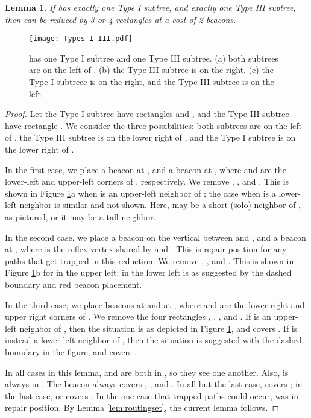 \documentclass{article}
\newtheorem{lemma}{Lemma}
\begin{document}
		\begin{lemma}\label{lem:onethree}
			If  has exactly one Type I subtree, and exactly one Type III subtree,
			then  can be reduced by 3 or 4 rectangles at a cost of 2 beacons.
		\end{lemma}
		\begin{figure}[htbp] 
			\begin{center}
				\texttt{[image: Types-I-III.pdf]} 
			\end{center}
			\caption{  has one Type I subtree and one Type III subtree.
					  (a) both subtrees are on the left of .
					  (b) the Type III subtree is on the right.
					  (c) the Type I subtreee is on the right, and the Type III subtree is on
					  the left.
					}
			\label{fig:typeonethree}
		\end{figure}
		\begin{proof}
			Let the Type I subtree have rectangles  and , 
			and the Type III subtree have rectangle .
			We consider the three possibilities:
			both subtrees are on the left of ,
			the Type III subtree is on the lower right of ,
			and the Type I subtree is on the lower right of .
			
			In the first case, we place a beacon  at ,
			and a beacon  at ,
			where  and  are the lower-left and upper-left corners of ,
			respectively.
			We remove , , and .  This is shown in Figure
			\ref{fig:typeonethree}a when  is an upper-left neighbor of ; the
			case when  is a lower-left neighbor is similar and not shown.  Here,
			 may be a short (solo) neighbor of , as pictured, or it may be a
			tall neighbor.
			
			In the second case, we place a beacon  on the vertical between 
			 and , and a beacon  at ,
			where  is the reflex vertex shared by  and .
			This is repair position for any paths that get trapped in this reduction.
			We remove , , and . 
			This is shown in Figure \ref{fig:typeonethree}b for  in the upper left;
			 in the lower left is as suggested by the dashed boundary and red
			beacon placement.
			
			In the third case, we place beacons  at  and
			 at , where  and  are the lower right and
			upper right corners of .  We remove the four rectangles ,
			, , and .
			If  is an upper-left neighbor of , then the situation is as depicted
			in Figure \ref{fig:typeonethree}, and  covers .
			If  is instead a lower-left neighbor of , then the situation is
			suggested with the dashed boundary in the figure, and  covers .
						
			In all cases in this lemma,  and  are both in , so they see
			one another.
			Also,  is always in .
			The beacon  always covers , , and .
			In all but the last case,  covers ; in the last case,
			 or  covers .
			In the one case that trapped paths could occur,  was in repair position.
			By Lemma \ref{lem:routingset}, the current lemma follows.
		\end{proof}
		
\end{document}
